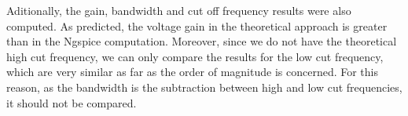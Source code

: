 \par Aditionally, the gain, bandwidth and cut off frequency results were also computed. As predicted, the voltage gain in the theoretical approach is greater than in the Ngspice computation. Moreover, since we do not have the theoretical high cut frequency, we can only compare the results for the low cut frequency, which are very similar as far as the order of magnitude is concerned. For this reason, as the bandwidth is the subtraction between high and low cut frequencies, it should not be compared.

\clearpage











